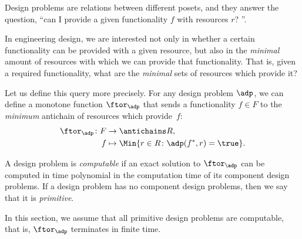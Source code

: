 
\label{sec:computation}

Design problems are relations between different posets, and they answer the question, ``can I provide a given functionality $f$ with resources $r$?
''.

In engineering design, we are interested not only in whether a certain functionality can be provided with a given resource, but also in the \emph{minimal} amount of resources with which we can provide that functionality.
That is, given a required functionality, what are the \emph{minimal} sets of resources which provide it?

Let us define this query more precisely.
For any design problem $\adp$, we can define a monotone function $\ftor_\adp$ that sends a functionality $f \in F$ to the \emph{minimum} antichain of resources which provide~$f$:
\begin{equation}
	\begin{aligned}
		\ftor_\adp \colon F & \to \antichains R,                                      \\
		f                   & \mapsto \Min \{ r \in R \colon \adp(f^*, r) = \true \}.
	\end{aligned}
\end{equation}

\begin{definition}
	A design problem is \emph{computable} if an exact solution to $\ftor_\adp$ can be computed in time polynomial in the computation time of its component design problems.
	If a design problem has no component design problems, then we say that it is \emph{primitive}.
\end{definition}

In this section, we assume that all primitive design problems are computable, that is, $\ftor_\adp$ terminates in finite time.



